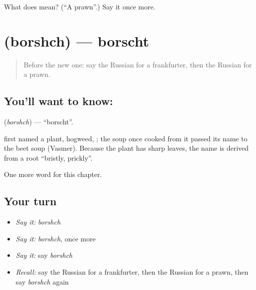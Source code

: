 \begin{tcolorbox}[breakable,colback=teal!4,colframe=teal!35!black,title={Before you move on}]
What does  mean? (\textquotedblleft{}A prawn\textquotedblright{}.) Say it once more.
\end{tcolorbox}
\section[\texorpdfstring{\ru{борщ} (borshch)}{борщ (borshch)}]{ (borshch) — borscht}

\label{lesson:RU-C163-borshch}



\begin{quote}
Before the new one: say the Russian for a frankfurter, then the Russian for a prawn.
\end{quote}

\subsection*{You'll want to know: }
\textbf{} (\emph{borshch}) — \textquotedblleft{}borscht\textquotedblright{}.

\begin{cousinweb}
\textbf{} first named a plant, hogweed, \emph{}; the soup once cooked from it passed its name to the beet soup (Vasmer). Because the plant has sharp leaves, the name is derived from a root \textquotedblleft{}bristly, prickly\textquotedblright{}.
\end{cousinweb}

\begin{grammarlens}[title={What you've built}]
One more word for this chapter.
\end{grammarlens}

\subsection*{Your turn}
\begin{itemize}
\raggedright
  \item \emph{Say it:} \emph{borshch}
  \item \emph{Say it:} \emph{borshch}, once more
  \item \emph{Say it:} say \emph{borshch}
  \item \emph{Recall:} say the Russian for a frankfurter, then the Russian for a prawn, then say \emph{borshch} again
\end{itemize}

